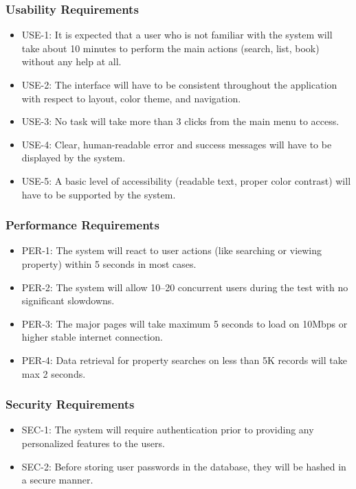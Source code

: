 \subsubsection{Usability Requirements}

\begin{itemize}
    \item USE-1: It is expected that a user who is not familiar with the system will take about 10 minutes to perform the main actions (search, list, book) without any help at all.
    \item USE-2: The interface will have to be consistent throughout the application with respect to layout, color theme, and navigation.
    \item USE-3: No task will take more than 3 clicks from the main menu to access.
    \item USE-4: Clear, human-readable error and success messages will have to be displayed by the system.
    \item USE-5: A basic level of accessibility (readable text, proper color contrast) will have to be supported by the system.
\end{itemize}

\subsubsection{Performance Requirements}

\begin{itemize}
    \item PER-1: The system will react to user actions (like searching or viewing property) within 5 seconds in most cases.
    \item PER-2: The system will allow 10--20 concurrent users during the test with no significant slowdowns.
    \item PER-3: The major pages will take maximum 5 seconds to load on 10Mbps or higher stable internet connection.
    \item PER-4: Data retrieval for property searches on less than 5K records will take max 2 seconds.
\end{itemize}

\subsubsection{Security Requirements}

\begin{itemize}
    \item SEC-1: The system will require authentication prior to providing any personalized features to the users.
    \item SEC-2: Before storing user passwords in the database, they will be hashed in a secure manner.
\end{itemize}

